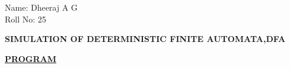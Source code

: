 \documentclass[10pt]{article}
\begin{document}
\noindent
Name: Dheeraj A G\\
Roll No: 25

\vspace{0.15cm}

\noindent
\makebox[\textwidth]{\dotfill}

\vspace{0.05cm}

\begin{center}
    \textbf{SIMULATION OF DETERMINISTIC FINITE AUTOMATA,DFA}
\end{center}

\vspace{0.05cm}

\noindent
\makebox[\textwidth]{\dotfill}

\vspace{0.15cm}

\noindent
\underline{\textbf{PROGRAM}}

\vspace{0.1cm}
\end{document}

